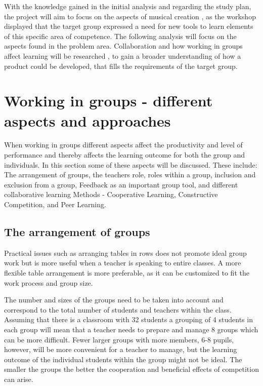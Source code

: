 With the knowledge gained in the initial analysis and regarding the study plan, the project will aim to focus on the aspects of musical creation , as the workshop displayed that the target group expressed a need for new tools to learn elements of this specific area of competence.
The following analysis will focus on the aspects found in the problem area. Collaboration and how working in groups affect learning will be researched  , to gain a broader understanding of how a product could be developed, that fills the requirements of the target group.\\




\section{Working in groups - different aspects and approaches} %

When working in groups different aspects affect the productivity and level of performance \cite{GodKlassekultur} and thereby affects the learning outcome for both the group and individuals. In this section some of these aspects will be discussed. These include: The arrangement of groups, the teachers role, roles within a group, inclusion and exclusion from a group, Feedback as an important group tool, and different collaborative learning Methods - Cooperative Learning, Constructive Competition, and Peer Learning.

\subsection{The arrangement of groups}\label{GroupArrangement}
Practical issues such as arranging tables in rows does not promote ideal group work but is more useful when a teacher is speaking to entire classes\cite{collaborationSocialPedagogy}. A more flexible table arrangement is more preferable, as it can be customized to fit the work process and group size\cite{collaborationSocialPedagogy}. 

The number and sizes of the groups need to be taken into account and correspond to the total number of students and teachers within the class. Assuming that there is a classroom with 32 students a grouping of 4 students in each group will mean that a teacher needs to prepare and manage 8 groups which can be more difficult. Fewer larger groups with more members, 6-8 pupils, however, will be more convenient for a teacher to manage, but the learning outcome of the individual students within the group might not be ideal\cite{collaborationSocialPedagogy}. The smaller the groups the better the cooperation and beneficial effects of competition can arise\cite{collaborationCompetitionGames}.

